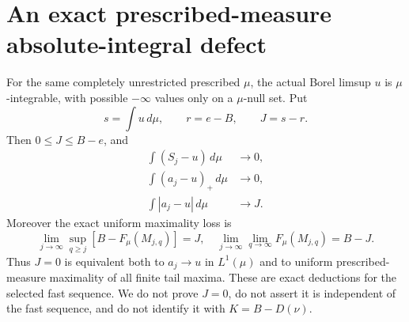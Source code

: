 \section{An exact prescribed-measure absolute-integral defect}
\begin{theorem}\label{new:Lone}
For the same completely unrestricted prescribed $\mu$, the actual
Borel limsup $u$ is $\mu$-integrable, with possible $-\infty$ values
only on a $\mu$-null set. Put
\[
 s=\int u\,d\mu,\qquad r=e-B,\qquad J=s-r.
\]
Then $0\le J\le B-e$, and
\begin{align}
 \int(S_j-u)\,d\mu&\longrightarrow0,\label{new:orderedmu}\\
 \int(a_j-u)_+\,d\mu&\longrightarrow0,\label{new:onesidemu}\\
 \int|a_j-u|\,d\mu&\longrightarrow J.\label{new:exactLone}
\end{align}
Moreover the exact uniform maximality loss is
\begin{equation}\label{new:lostmax}
 \lim_{j\to\infty}\sup_{q\ge j}[B-F_\mu(M_{j,q})]=J,
 \quad
 \lim_{j\to\infty}\lim_{q\to\infty}F_\mu(M_{j,q})=B-J.
\end{equation}
Thus $J=0$ is equivalent both to $a_j\to u$ in $L^1(\mu)$ and to
uniform prescribed-measure maximality of all finite tail maxima.
These are exact deductions for the selected fast sequence. We do not
prove $J=0$, do not assert it is independent of the fast sequence,
and do not identify it with $K=B-D(\nu)$.
\end{theorem}
